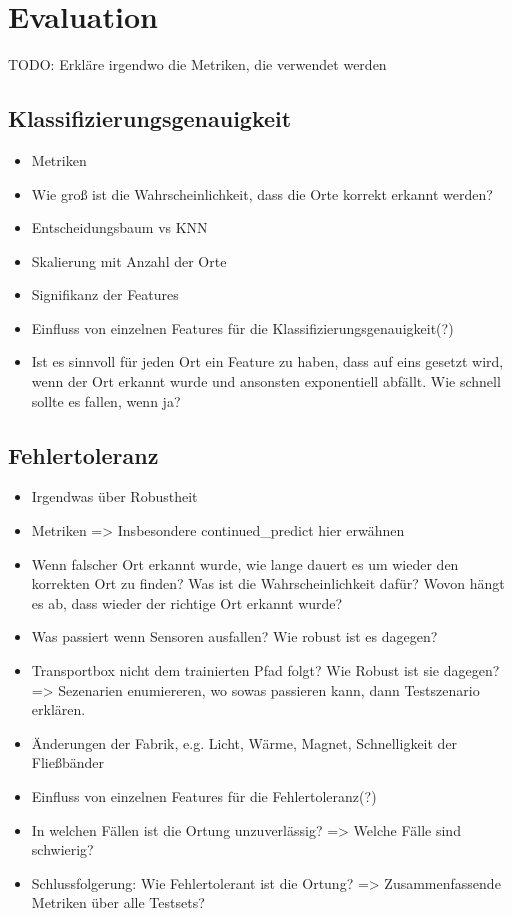 \chapter{Evaluation}
TODO: Erkläre irgendwo die Metriken, die verwendet werden

\section{Klassifizierungsgenauigkeit}
\begin{itemize}
    \item Metriken
    \item Wie groß ist die Wahrscheinlichkeit, dass die Orte korrekt erkannt werden?
    \item Entscheidungsbaum vs KNN
    \item Skalierung mit Anzahl der Orte
    \item Signifikanz der Features
    \item Einfluss von einzelnen Features für die Klassifizierungsgenauigkeit(?)
    \item Ist es sinnvoll für jeden Ort ein Feature zu haben, dass auf eins gesetzt wird, wenn der Ort erkannt wurde und ansonsten exponentiell abfällt. Wie schnell sollte es fallen, wenn ja?
\end{itemize}

\section{Fehlertoleranz}
\begin{itemize}
    \item Irgendwas über Robustheit
    \item Metriken => Insbesondere continued\_predict hier erwähnen
    \item Wenn falscher Ort erkannt wurde, wie lange dauert es um wieder den korrekten Ort zu finden? Was ist die Wahrscheinlichkeit dafür? Wovon hängt es ab, dass wieder der richtige Ort erkannt wurde?
    \item Was passiert wenn Sensoren ausfallen? Wie robust ist es dagegen?
    \item Transportbox nicht dem trainierten Pfad folgt? Wie Robust ist sie dagegen? => Sezenarien enumiereren, wo sowas passieren kann, dann Testszenario erklären.
    \item Änderungen der Fabrik, e.g. Licht, Wärme, Magnet, Schnelligkeit der Fließbänder
    \item Einfluss von einzelnen Features für die Fehlertoleranz(?)
    \item In welchen Fällen ist die Ortung unzuverlässig? => Welche Fälle sind schwierig?
    \item Schlussfolgerung: Wie Fehlertolerant ist die Ortung? => Zusammenfassende Metriken über alle Testsets?
\end{itemize}

